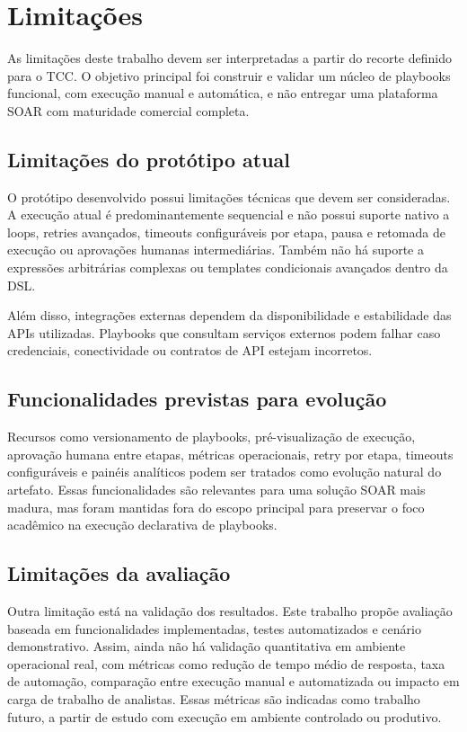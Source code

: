 \documentclass[article,a4paper,12pt,english,brazil,sumario=tradicional]{abntex2}
\begin{document}
\section{Limitações}

As limitações deste trabalho devem ser interpretadas a partir do recorte definido para o TCC. O objetivo principal foi construir e validar um núcleo de playbooks funcional, com execução manual e automática, e não entregar uma plataforma SOAR com maturidade comercial completa.

\subsection{Limitações do protótipo atual}

O protótipo desenvolvido possui limitações técnicas que devem ser consideradas. A execução atual é predominantemente sequencial e não possui suporte nativo a loops, retries avançados, timeouts configuráveis por etapa, pausa e retomada de execução ou aprovações humanas intermediárias. Também não há suporte a expressões arbitrárias complexas ou templates condicionais avançados dentro da DSL.

Além disso, integrações externas dependem da disponibilidade e estabilidade das APIs utilizadas. Playbooks que consultam serviços externos podem falhar caso credenciais, conectividade ou contratos de API estejam incorretos.

\subsection{Funcionalidades previstas para evolução}

Recursos como versionamento de playbooks, pré-visualização de execução, aprovação humana entre etapas, métricas operacionais, retry por etapa, timeouts configuráveis e painéis analíticos podem ser tratados como evolução natural do artefato. Essas funcionalidades são relevantes para uma solução SOAR mais madura, mas foram mantidas fora do escopo principal para preservar o foco acadêmico na execução declarativa de playbooks.

\subsection{Limitações da avaliação}

Outra limitação está na validação dos resultados. Este trabalho propõe avaliação baseada em funcionalidades implementadas, testes automatizados e cenário demonstrativo. Assim, ainda não há validação quantitativa em ambiente operacional real, com métricas como redução de tempo médio de resposta, taxa de automação, comparação entre execução manual e automatizada ou impacto em carga de trabalho de analistas. Essas métricas são indicadas como trabalho futuro, a partir de estudo com execução em ambiente controlado ou produtivo.
\end{document}
